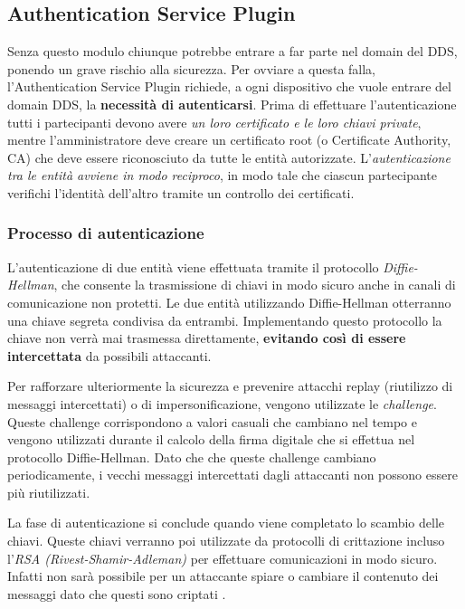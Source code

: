 \subsection{Authentication Service Plugin}
Senza questo modulo chiunque potrebbe entrare a far parte nel domain
del DDS, ponendo un grave rischio alla sicurezza. Per ovviare a questa
falla, l'Authentication Service Plugin richiede, a ogni dispositivo che 
vuole entrare del domain DDS, la \textbf{necessità di autenticarsi}.
Prima di effettuare l'autenticazione tutti i partecipanti devono 
avere \textit{un loro certificato e le loro chiavi private}, mentre 
l'amministratore deve creare un certificato root (o Certificate Authority, CA) 
che deve essere riconosciuto da tutte le entità autorizzate. 
L'\textit{autenticazione tra le entità avviene in modo reciproco}, 
in modo tale che ciascun partecipante verifichi l'identità dell'altro
tramite un controllo dei certificati.


\subsubsection{Processo di autenticazione}
L'autenticazione di due entità viene effettuata
tramite il protocollo \textit{Diffie-Hellman}, che consente la trasmissione 
di chiavi in modo sicuro anche in canali di comunicazione non protetti.
Le due entità utilizzando Diffie-Hellman otterranno una chiave 
segreta condivisa da entrambi. Implementando questo 
protocollo la chiave non verrà mai 
trasmessa direttamente, \textbf{evitando così di essere intercettata} da 
possibili attaccanti. 

Per rafforzare ulteriormente la sicurezza e prevenire attacchi replay 
(riutilizzo di messaggi intercettati) o di impersonificazione, vengono 
utilizzate le \textit{challenge}. Queste challenge corrispondono a valori 
casuali che cambiano nel tempo e vengono utilizzati durante il 
calcolo della firma digitale che si effettua nel protocollo
Diffie-Hellman.
Dato che che queste challenge cambiano periodicamente,
i vecchi messaggi intercettati dagli attaccanti non possono essere 
più riutilizzati.

La fase di autenticazione si conclude quando viene completato
lo scambio delle chiavi.
Queste chiavi verranno poi utilizzate da protocolli di 
crittazione incluso l'\textit{RSA (Rivest-Shamir-Adleman)} per effettuare 
comunicazioni in modo sicuro. Infatti non sarà possibile per un 
attaccante spiare o cambiare il contenuto dei messaggi dato 
che questi sono criptati 
\cite{DBLP:conf/asiaccs/WangLG24}.
\label{Processo di autenticazione}

